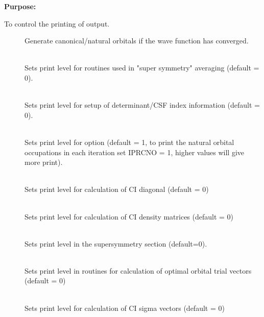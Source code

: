 {\bf Purpose:}

To control the printing of output.

\begin{description}
\item[]
  Generate canonical/natural orbitals if the wave function has
  converged.

\item[]
   \\
  Sets print level for routines used in "super symmetry" averaging
  (default = 0).

\item[]
   \\
  Sets print level for setup of determinant/CSF index information (default = 0).

\item[]
   \\
  Sets print level for  option (default = 1,
  to print the natural orbital occupations in each iteration set
  IPRCNO = 1, higher values will give more print).

\item[]
   \\
  Sets print level for calculation of CI diagonal (default = 0)

\item[]
   \\
  Sets print level for calculation of CI density matrices (default = 0)


\item[]
   \\
  Sets print level in the supersymmetry section (default=0).

\item[]
   \\
  Sets print level in routines for calculation of optimal orbital trial
  vectors (default = 0)

\item[]
   \\
  Sets print level for calculation of CI sigma vectors (default = 0)


\end{description}
